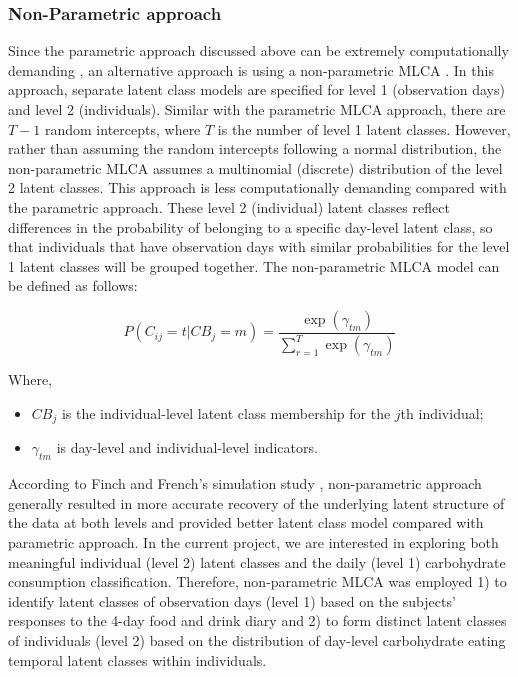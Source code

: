 \vspace{-0.5cm}
\subsubsection{Non-Parametric approach}\vspace{-0.3cm}


Since the parametric approach discussed above can be extremely computationally demanding \parencite{van2008using, vermunt2008latent}, an alternative approach is using a non-parametric MLCA \parencite{davidian2008growth}. In this approach, separate latent class models are specified for level 1 (observation days) and level 2 (individuals). Similar with the parametric MLCA approach, there are $T-1$ random intercepts, where $T$ is the number of level 1 latent classes. However, rather than assuming the random intercepts following a normal distribution, the non-parametric MLCA assumes a multinomial (discrete) distribution of the level 2 latent classes. This approach is less computationally demanding compared with the parametric approach. These level 2 (individual) latent classes reflect differences in the probability of belonging to a specific day-level latent class, so that individuals that have observation days with similar probabilities for the level 1 latent classes will be grouped together. The non-parametric MLCA model can be defined as follows: 

\begin{equation}
P(C_{ij} = t | CB_j = m)  = \frac{\exp(\gamma_{tm})}{\sum_{r=1}^{T}\exp(\gamma_{tm})}
\end{equation}

Where, 

\begin{itemize}
	\item $CB_j$ is the individual-level latent class membership for the $j$th individual;
	\item $\gamma_{tm}$ is day-level and individual-level indicators. 
\end{itemize}

According to Finch and French's simulation study \parencite{finch2014multilevel}, non-parametric approach generally resulted in more accurate recovery of the underlying latent structure of the data at both levels and provided better latent class model compared with parametric approach. In the current project, we are interested in exploring both meaningful individual (level 2) latent classes and the daily (level 1) carbohydrate consumption classification. Therefore, non-parametric MLCA was employed 1) to identify latent classes of observation days (level 1) based on the subjects' responses to the 4-day food and drink diary and 2) to form distinct latent classes of individuals (level 2) based on the distribution of day-level carbohydrate eating temporal latent classes within individuals.\vspace{-0.3cm}
 

